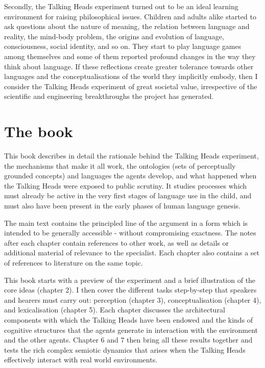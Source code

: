 Secondly, the Talking Heads experiment turned out to be 
an ideal learning environment for raising philosophical
issues. Children and adults alike
started to ask questions about the nature of
meaning, the relation between language
and reality, the mind-body problem, 
the origins and evolution of language, 
consciousness, social identity, and so on. They 
start to play language games among themselves and some of
them reported profound changes in the way they 
think about language. If these reflections create 
greater tolerance towards other languages and 
the conceptualisations of the world
they implicitly embody, then I consider the
Talking Heads experiment of great societal value, irrespective of
the scientific and engineering breakthroughs
the project has generated. 

\section{The book}

This book describes in detail the rationale behind the 
Talking Heads experiment, the mechanisms that make it
all work, the ontologies (sets of perceptually 
grounded concepts) and 
languages the agents develop, and what happened
when the Talking Heads were exposed to public scrutiny. 
It studies processes which must already be active in the 
very first stages of language use in the child, and 
must also have been present in the early phases of 
human language genesis. 

The main text contains the
principled line of the argument in a form which is intended to be generally
accessible - without compromising exactness. The notes after
each chapter contain references to other work, as well 
as details or additional material of relevance to the 
specialist. Each chapter also contains a set of references to
literature on the same topic. 

This book starts with a preview of the 
experiment and a brief illustration of the core ideas (chapter 2). 
I then cover the 
different tasks step-by-step that speakers and hearers must carry out: 
perception (chapter 3), conceptualisation (chapter 4), 
and lexicalisation (chapter 5). Each 
chapter discusses the 
architectural components with which the Talking Heads 
have been endowed and the kinds of cognitive structures that 
the agents generate in interaction with the environment 
and the other agents. Chapter 6 and 7 then bring all these 
results together and tests the rich complex semiotic dynamics that 
arises when the Talking Heads effectively interact 
with real world environments. 


